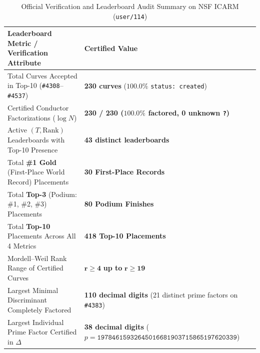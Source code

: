 \documentclass[10pt,a4paper]{article}
\theoremstyle{plain}
\theoremstyle{definition}
\theoremstyle{remark}
\begin{document}
\begin{table}[htbp]
\centering
\footnotesize
\caption{Official Verification and Leaderboard Audit Summary on NSF ICARM (\texttt{user/114})}
\label{tab:icarm_summary}
\begin{tabularx}{\textwidth}{l>{\raggedright\arraybackslash}X}
\toprule
\textbf{Leaderboard Metric / Verification Attribute} & \textbf{Certified Value} \\
\midrule
Total Curves Accepted in Top-10 (\texttt{\#4308}--\texttt{\#4537}) & \textbf{230 curves} ($100.0\%$ \texttt{status:\ created}) \\
Certified Conductor Factorizations ($\log N$) & \textbf{230 / 230 ($100.0\%$ factored, 0 unknown \texttt{?})} \\
Active $(T, \mathrm{Rank})$ Leaderboards with Top-10 Presence & \textbf{43 distinct leaderboards} \\
Total \textbf{\#1 Gold} (First-Place World Record) Placements & \textbf{30 First-Place Records} \\
Total \textbf{Top-3} (Podium: \#1, \#2, \#3) Placements & \textbf{80 Podium Finishes} \\
Total \textbf{Top-10} Placements Across All 4 Metrics & \textbf{418 Top-10 Placements} \\
Mordell--Weil Rank Range of Certified Curves & $\mathbf{r \ge 4}$ \textbf{up to} $\mathbf{r \ge 19}$ \\
Largest Minimal Discriminant Completely Factored & \textbf{110 decimal digits} (21 distinct prime factors on \texttt{\#4383}) \\
Largest Individual Prime Factor Certified in $\Delta$ & \textbf{38 decimal digits} ($p = \texttt{19784615932645016681903715865197620339}$) \\
\bottomrule
\end{tabularx}
\end{table}
\end{document}
